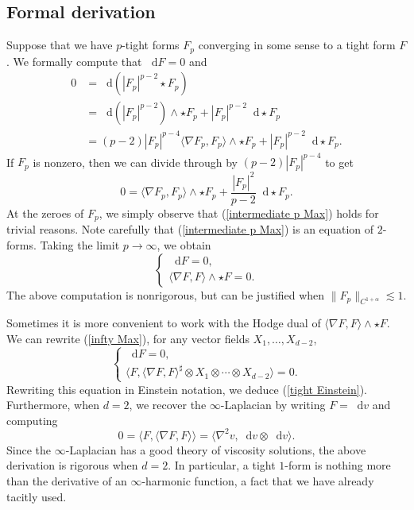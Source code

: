 \documentclass[reqno,11pt]{amsart}
\newcommand*\dif{\mathop{}\!\mathrm{d}}
\theoremstyle{definition}
\numberwithin{equation}{section}
\begin{document}
\subsection{Formal derivation}
Suppose that we have $p$-tight forms $F_p$ converging in some sense to a tight form $F$.
We formally compute that $\dif F = 0$ and
\begin{align*}
0
&= \dif(|F_p|^{p - 2} \star F_p) \\
&= \dif(|F_p|^{p - 2}) \wedge \star F_p + |F_p|^{p - 2} \dif \star F_p \\
&= (p - 2) |F_p|^{p - 4} \langle \nabla F_p, F_p\rangle \wedge \star F_p + |F_p|^{p - 2} \dif \star F_p.
\end{align*}
If $F_p$ is nonzero, then we can divide through by $(p - 2) |F_p|^{p - 4}$ to get
\begin{equation}\label{intermediate p Max}
0 = \langle\nabla F_p, F_p\rangle \wedge \star F_p + \frac{|F_p|^2}{p - 2} \dif \star F_p.
\end{equation}
At the zeroes of $F_p$, we simply observe that (\ref{intermediate p Max}) holds for trivial reasons.
Note carefully that (\ref{intermediate p Max}) is an equation of $2$-forms.
Taking the limit $p \to \infty$, we obtain 
\begin{equation}\label{infty Max}
\begin{cases}
\dif F = 0, \\
\langle \nabla F, F\rangle \wedge \star F = 0.
\end{cases}
\end{equation}
The above computation is nonrigorous, but can be justified when $\|F_p\|_{C^{1 + \alpha}} \lesssim 1$.

Sometimes it is more convenient to work with the Hodge dual of $\langle \nabla F, F\rangle \wedge \star F$.
We can rewrite (\ref{infty Max}), for any vector fields $X_1, \dots, X_{d - 2}$,
\begin{equation}\label{dual infty Max}
\begin{cases}
\dif F = 0, \\
\langle F, \langle \nabla F, F\rangle^\sharp \otimes X_1 \otimes \cdots \otimes X_{d - 2}\rangle = 0.
\end{cases}
\end{equation}
Rewriting this equation in Einstein notation, we deduce (\ref{tight Einstein}).
Furthermore, when $d = 2$, we recover the $\infty$-Laplacian by writing $F = \dif v$ and computing 
$$0 = \langle F, \langle \nabla F, F\rangle\rangle = \langle \nabla^2 v, \dif v \otimes \dif v\rangle.$$
Since the $\infty$-Laplacian has a good theory of viscosity solutions, the above derivation is rigorous when $d = 2$.
In particular, a tight $1$-form is nothing more than the derivative of an $\infty$-harmonic function, a fact that we have already tacitly used.
\end{document}
